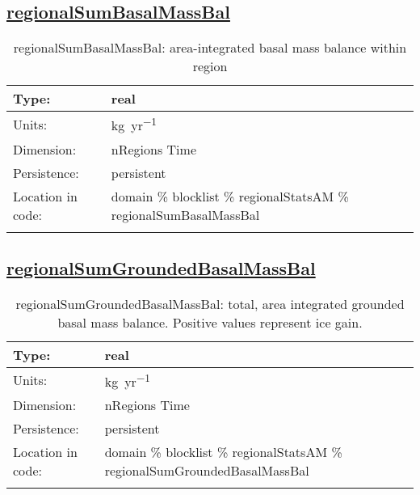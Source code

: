 \subsection[regionalSumBasalMassBal]{\hyperref[sec:var_tab_regionalStatsAM]{regionalSumBasalMassBal}}
\label{subsec:var_sec_regionalStatsAM_regionalSumBasalMassBal}
\begin{center}
\begin{longtable}{| p{2.0in} | p{4.0in} |}
        \hline 
        Type: & real \\
        \hline 
        Units: & \si{kg.yr^{-1}} \\
        \hline 
        Dimension: & nRegions Time \\
        \hline 
        Persistence: & persistent \\
        \hline 
         Location in code: & domain \% blocklist \% regionalStatsAM \% regionalSumBasalMassBal \\
         \hline 
    \caption{regionalSumBasalMassBal: area-integrated basal mass balance within region}
\end{longtable}
\end{center}
\subsection[regionalSumGroundedBasalMassBal]{\hyperref[sec:var_tab_regionalStatsAM]{regionalSumGroundedBasalMassBal}}
\label{subsec:var_sec_regionalStatsAM_regionalSumGroundedBasalMassBal}
\begin{center}
\begin{longtable}{| p{2.0in} | p{4.0in} |}
        \hline 
        Type: & real \\
        \hline 
        Units: & \si{kg.yr^{-1}} \\
        \hline 
        Dimension: & nRegions Time \\
        \hline 
        Persistence: & persistent \\
        \hline 
         Location in code: & domain \% blocklist \% regionalStatsAM \% regionalSumGroundedBasalMassBal \\
         \hline 
    \caption{regionalSumGroundedBasalMassBal: total, area integrated grounded basal mass balance. Positive values represent ice gain.}
\end{longtable}
\end{center}
